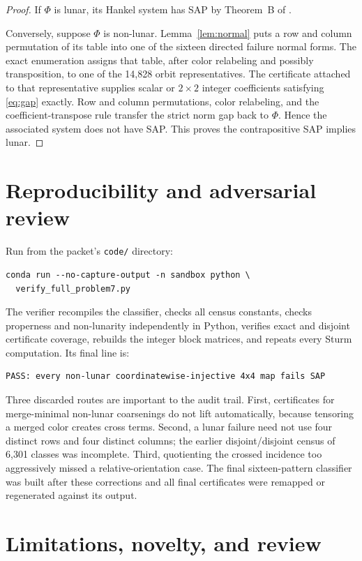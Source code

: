\documentclass[11pt]{article}
\begin{document}
\begin{proof}
If $\Phi$ is lunar, its Hankel system has SAP by Theorem~B of
\cite{HanQiuWang2024}.

Conversely, suppose $\Phi$ is non-lunar.  Lemma~\ref{lem:normal} puts a row
and column permutation of its table into one of the sixteen directed failure
normal forms.  The exact enumeration assigns that table, after color
relabeling and possibly transposition, to one of the 14,828 orbit
representatives.  The certificate attached to that representative supplies
scalar or $2\times2$ integer coefficients satisfying \eqref{eq:gap} exactly.
Row and column permutations, color relabeling, and the coefficient-transpose
rule transfer the strict norm gap back to $\Phi$.  Hence the associated system
does not have SAP.  This proves the contrapositive SAP implies lunar.
\end{proof}

\section{Reproducibility and adversarial review}

Run from the packet's \texttt{code/} directory:
\begin{verbatim}
conda run --no-capture-output -n sandbox python \
  verify_full_problem7.py
\end{verbatim}
The verifier recompiles the classifier, checks all census constants, checks
properness and non-lunarity independently in Python, verifies exact and
disjoint certificate coverage, rebuilds the integer block matrices, and
repeats every Sturm computation.  Its final line is:
\begin{verbatim}
PASS: every non-lunar coordinatewise-injective 4x4 map fails SAP
\end{verbatim}

Three discarded routes are important to the audit trail.  First, certificates
for merge-minimal non-lunar coarsenings do not lift automatically, because
tensoring a merged color creates cross terms.  Second, a lunar failure need
not use four distinct rows and four distinct columns; the earlier
disjoint/disjoint census of 6,301 classes was incomplete.  Third, quotienting
the crossed incidence too aggressively missed a relative-orientation case.
The final sixteen-pattern classifier was built after these corrections and
all final certificates were remapped or regenerated against its output.

\section{Limitations, novelty, and review}
\end{document}
